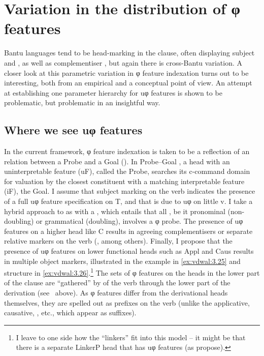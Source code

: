 \documentclass[output=paper]{langsci/langscibook}
\begin{document}
\section{Variation in the distribution of φ features}\label{sec:3.3}

Bantu languages tend to be head-marking in the clause, often displaying subject
and , as well as complementiser , but again there is
cross-Bantu variation. A closer look at this parametric variation in φ feature
indexation turns out to be interesting, both from an empirical and a conceptual
point of view. An attempt at establishing one parameter hierarchy for uφ
features is shown to be problematic, but problematic in an insightful way.

\subsection{Where we see uφ features}\label{sub:3.3.1}

In the current framework, φ feature indexation is taken to be a reflection of
an  relation between a Probe and a Goal (\citealt{Chomsky2000,Chomsky2001}). In
Probe--Goal , a head with an uninterpretable feature (uF), called the
Probe, searches its c-command domain for valuation by the closest constituent
with a matching interpretable feature (iF), the Goal. I assume that subject
marking on the verb indicates the presence of a full uφ feature specification
on T, and that  is due to uφ on little v. I take a hybrid
approach to  as  with a 
\citep{Roberts2010,Iorio2014,vanderWal2015}, which
entails that all , be it pronominal (non-doubling) or grammatical
(doubling), involves a φ probe. The presence of uφ features on a higher head
like C results in agreeing complementisers or separate relative markers on the
verb (\citealt{Carstens2003,Henderson2011}, among others). Finally,
I propose that the presence of uφ features on lower functional heads such as
Appl and Caus results in multiple object markers, illustrated in the example in
\eqref{ex:vdwal:3.25} and structure in \eqref{ex:vdwal:3.26}.\footnote{I leave to
    one side how the  \enquote{linkers}
    \parencite{BakerCollins2006,Schneider-Zioga2015} fit into this model -- it
    might be that there is a separate LinkerP head that has uφ features (as
\citealt{BakerCollins2006} propose).} The sets of φ features on the heads in
the lower part of the clause are “gathered” by  of the verb
through the lower part of the derivation (see~ above).  As φ
features differ from the derivational heads themselves, they are spelled out as
prefixes on the verb (unlike the applicative, causative, , etc., which
appear as suffixes).
\end{document}
